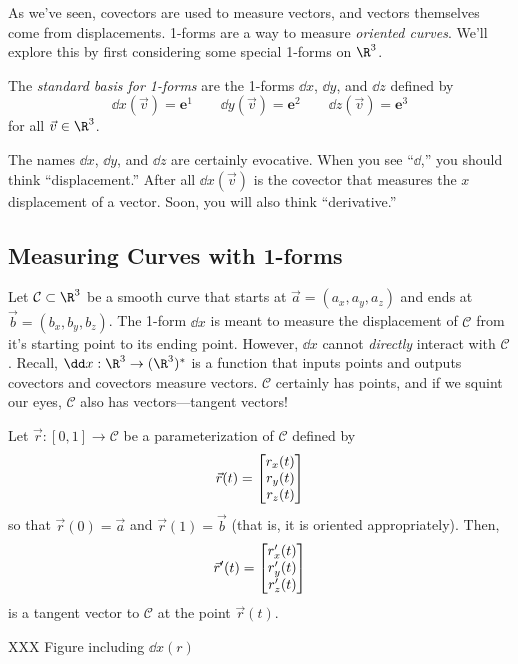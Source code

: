 As we've seen, covectors are used to measure vectors, and 
vectors themselves come from displacements.  1-forms are a way
to measure \emph{oriented curves}.  We'll explore this by
first considering some special 1-forms on $\R^3$.

\begin{definition}
	The
	\emph{standard basis for 1-forms} are the 1-forms
	$\dd x$, $\dd y$, and $\dd z$ defined by
	\[
		\dd x(\vec v) = \bm e^1\qquad \dd y(\vec v)=\bm e^2\qquad
		\dd z(\vec v) = \bm e^3
	\]
	for all $\vec v\in \R^3$.
\end{definition}

The names $\dd x$, $\dd y$, and $\dd z$
are certainly evocative.  When you see
``$\dd$,'' you should think ``displacement.''  After all
$\dd x(\vec v)$ is the covector that measures the $x$ displacement
of a vector.  Soon, you will
also think ``derivative.''

\subsection{Measuring Curves with 1-forms}

Let $\mathcal C\subset \R^3$ be a smooth curve that starts at $\vec a=(a_x,a_y,a_z)$
and ends at $\vec b=(b_x,b_y,b_z)$.  The 1-form $\dd x$ is meant to measure the
displacement of $\mathcal C$ from it's starting point to its ending point.
However, $\dd x$ cannot \emph{directly} interact with $\mathcal C$.
Recall, $\dd x:\R^3\to (\R^3)^*$ is a function that inputs points
and outputs covectors and covectors measure vectors.  $\mathcal C$ certainly
has points, and if we squint our eyes, $\mathcal C$ also has vectors---tangent
vectors!

Let $\vec r:[0,1]\to\mathcal C$ be a parameterization of $\mathcal C$ defined by
\[
\vec r(t) = \mat{r_x(t)\\r_y(t)\\r_z(t)}
\]
so that $\vec r(0)=\vec a$ and $\vec r(1)=\vec b$ (that is, it is oriented 
appropriately). Then, 
\[\vec r'(t) =\mat{r_x'(t)\\r_y'(t)\\r_z'(t)}
\]is a tangent vector to $\mathcal C$ at the
point $\vec r(t)$.

XXX Figure including $\dd x(r)$

